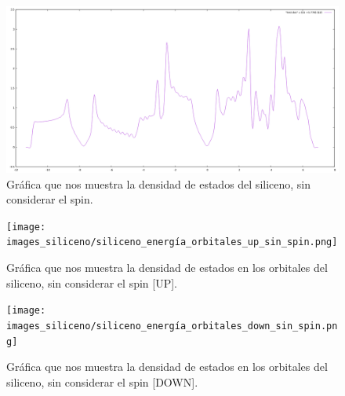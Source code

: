 \begin{frame}
    \begin{figure}[H]
        \centering
        \includegraphics[scale=0.25]{images_siliceno/plot_sin_spin.png}
        \caption{Gráfica que nos muestra la densidad de estados del siliceno, sin considerar el spin.}
    \end{figure}
\end{frame}

\begin{frame}
    \begin{figure}[H]
        \centering
        \texttt{[image: images\_siliceno/siliceno\_energía\_orbitales\_up\_sin\_spin.png]}
        \caption{Gráfica que nos muestra la densidad de estados en los orbitales del siliceno, sin considerar el spin [UP].}
    \end{figure}
\end{frame}

\begin{frame}
    \begin{figure}[H]
        \centering
        \texttt{[image: images\_siliceno/siliceno\_energía\_orbitales\_down\_sin\_spin.png]}
        \caption{Gráfica que nos muestra la densidad de estados en los orbitales del siliceno, sin considerar el spin [DOWN].}
    \end{figure}
\end{frame}


